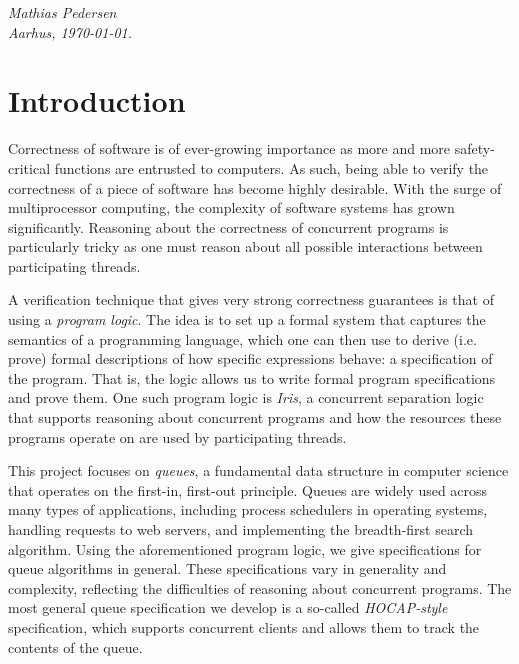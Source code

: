 \documentclass[a4paper, 10pt]{report}
\theoremstyle{definition}
\begin{document}
\vspace{2ex}
\begin{flushright}
  \emph{Mathias Pedersen}\\
  \emph{Aarhus, \today.}
\end{flushright}


\tableofcontents
\cleardoublepage
{}
\setcounter{secnumdepth}{2}


\chapter{Introduction}
\label{ch:intro}

Correctness of software is of ever-growing importance as more and more safety-critical functions are entrusted to computers. As such, being able to verify the correctness of a piece of software has become highly desirable. With the surge of multiprocessor computing, the complexity of software systems has grown significantly. Reasoning about the correctness of concurrent programs is particularly tricky as one must reason about all possible interactions between participating threads.

A verification technique that gives very strong correctness guarantees is that of using a \textit{program logic}. The idea is to set up a formal system that captures the semantics of a programming language, which one can then use to derive (i.e. prove) formal descriptions of how specific expressions behave: a specification of the program. That is, the logic allows us to write formal program specifications and prove them. One such program logic is \textit{Iris}, a concurrent separation logic that supports reasoning about concurrent programs and how the resources these programs operate on are used by participating threads.

This project focuses on \textit{queues}, a fundamental data structure in computer science that operates on the first-in, first-out principle. Queues are widely used across many types of applications, including process schedulers in operating systems, handling requests to web servers, and implementing the breadth-first search algorithm. Using the aforementioned program logic, we give specifications for queue algorithms in general. These specifications vary in generality and complexity, reflecting the difficulties of reasoning about concurrent programs. The most general queue specification we develop is a so-called \textit{HOCAP-style} specification, which supports concurrent clients and allows them to track the contents of the queue.
\end{document}
